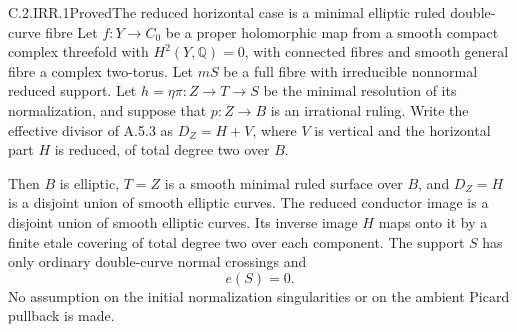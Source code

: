 \begin{statement}{C.2.IRR.1}{Proved}{The reduced horizontal case is a minimal elliptic ruled double-curve fibre}
Let $f:Y\to C_0$ be a proper holomorphic map from a smooth compact
complex threefold with $H^2(Y,\mathbb Q)=0$, with connected fibres
and smooth general fibre a complex two-torus. Let $mS$ be a full
fibre with irreducible nonnormal reduced support. Let
$h=\eta\pi:Z\to T\to S$ be the minimal resolution of its
normalization, and suppose that $p:Z\to B$ is an irrational
ruling. Write the effective divisor of A.5.3 as
$D_Z=H+V$, where $V$ is vertical and the horizontal part $H$
is reduced, of total degree two over $B$.

Then $B$ is elliptic, $T=Z$ is a smooth minimal ruled surface
over $B$, and $D_Z=H$ is a disjoint union of smooth elliptic
curves. The reduced conductor image is a disjoint union of
smooth elliptic curves. Its inverse image $H$ maps onto it
by a finite etale covering of total degree two over each
component. The support $S$ has only ordinary double-curve
normal crossings and
\[
                         e(S)=0.                 \tag{C.IR.1}
\]
No assumption on the initial normalization singularities or
on the ambient Picard pullback is made.
\end{statement}
